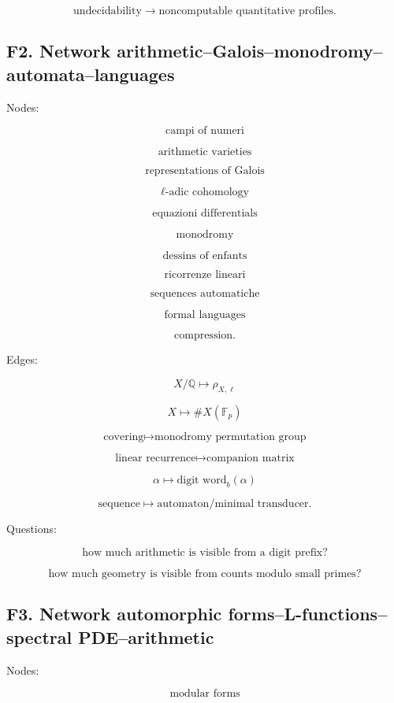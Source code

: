 \documentclass[11pt]{article}
\begin{document}
\[
\text{undecidability}
\to
\text{noncomputable quantitative profiles}.
\]



\subsection{F2. Network arithmetic--Galois--monodromy--automata--languages}

Nodes:

\[
\text{campi of numeri}
\]

\[
\text{arithmetic varieties}
\]

\[
\text{representations of Galois}
\]

\[
\ell\text{-adic cohomology}
\]

\[
\text{equazioni differentials}
\]

\[
\text{monodromy}
\]

\[
\text{dessins of enfants}
\]

\[
\text{ricorrenze lineari}
\]

\[
\text{sequences automatiche}
\]

\[
\text{formal languages}
\]

\[
\text{compression}.
\]

Edges:

\[
X/\mathbb Q\mapsto \rho_{X,\ell}
\]

\[
X\mapsto \#X(\mathbb F_p)
\]

\[
\text{covering}\mapsto \text{monodromy permutation group}
\]

\[
\text{linear recurrence}\mapsto \text{companion matrix}
\]

\[
\alpha\mapsto \text{digit word}_b(\alpha)
\]

\[
\text{sequence}\mapsto \text{automaton/minimal transducer}.
\]

Questions:

\[
\text{how much arithmetic is visible from a digit prefix?}
\]

\[
\text{how much geometry is visible from counts modulo small primes?}
\]



\subsection{F3. Network automorphic forms--L-functions--spectral PDE--arithmetic}

Nodes:

\[
\text{modular forms}
\]
\end{document}
